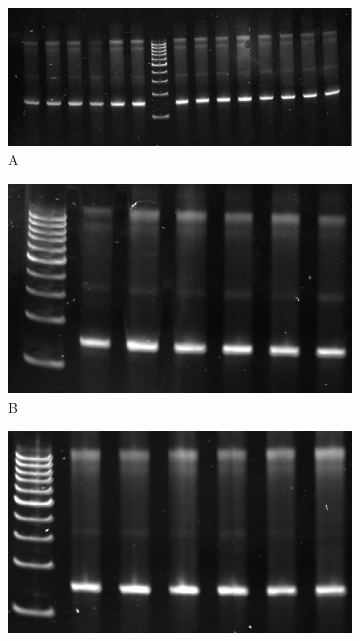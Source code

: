 \documentclass[parskip=full, numbers=noenddot]{scrreprt}
\begin{document}
\begin{figure}[htpb]
  \centering
  \begin{subfigure}[htpb]{0.4\textwidth}
    \centering
    \includegraphics[width=\textwidth]{amplig_a}
    \caption{A}
    \label{fig:amplig_a}
  \end{subfigure}
  \begin{subfigure}[htpb]{0.4\textwidth}
    \centering
    \includegraphics[width=\textwidth]{amplig_b}
    \caption{B}
    \label{fig:amplig_b}
  \end{subfigure}
  \begin{subfigure}[htpb]{0.4\textwidth}
    \centering
    \includegraphics[width=\textwidth]{amplig_c}

\end{subfigure}
\end{figure}
\end{document}
